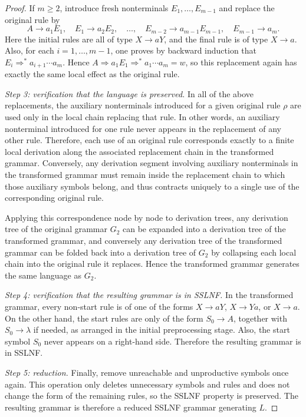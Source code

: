 \documentclass[11pt,a4paper]{article}
\begin{document}
\begin{proof}
If $m\ge 2$, introduce fresh nonterminals $E_1,\dots,E_{m-1}$ and replace the original rule by
\[
A\to a_1E_1,\quad
E_1\to a_2E_2,\quad
\dots,\quad
E_{m-2}\to a_{m-1}E_{m-1},\quad
E_{m-1}\to a_m.
\]
Here the initial rules are all of type $X\to aY$, and the final rule is of type $X\to a$. Also, for each $i=1,\dots,m-1$, one proves by backward induction that
$E_i\Rightarrow^* a_{i+1}\cdots a_m$.
Hence
$A\Rightarrow a_1E_1\Rightarrow^* a_1\cdots a_m=w$,
so this replacement again has exactly the same local effect as the original rule.

\smallskip\noindent\emph{Step 3: verification that the language is preserved.}
In all of the above replacements, the auxiliary nonterminals introduced for a given original rule $\rho$ are used only in the local chain replacing that rule. In other words, an auxiliary nonterminal introduced for one rule never appears in the replacement of any other rule. Therefore, each use of an original rule corresponds exactly to a finite local derivation along the associated replacement chain in the transformed grammar. Conversely, any derivation segment involving auxiliary nonterminals in the transformed grammar must remain inside the replacement chain to which those auxiliary symbols belong, and thus contracts uniquely to a single use of the corresponding original rule.

Applying this correspondence node by node to derivation trees, any derivation tree of the original grammar $G_2$ can be expanded into a derivation tree of the transformed grammar, and conversely any derivation tree of the transformed grammar can be folded back into a derivation tree of $G_2$ by collapsing each local chain into the original rule it replaces. Hence the transformed grammar generates the same language as $G_2$.

\smallskip\noindent\emph{Step 4: verification that the resulting grammar is in SSLNF.}
In the transformed grammar, every non-start rule is of one of the forms $X\to aY$, $X\to Ya$, or $X\to a$. On the other hand, the start rules are only of the form $S_0\to A$, together with $S_0\to\lambda$ if needed, as arranged in the initial preprocessing stage. Also, the start symbol $S_0$ never appears on a right-hand side. Therefore the resulting grammar is in SSLNF.

\smallskip\noindent\emph{Step 5: reduction.}
Finally, remove unreachable and unproductive symbols once again. This operation only deletes unnecessary symbols and rules and does not change the form of the remaining rules, so the SSLNF property is preserved. The resulting grammar is therefore a reduced SSLNF grammar generating $L$.


\end{proof}
\end{document}
